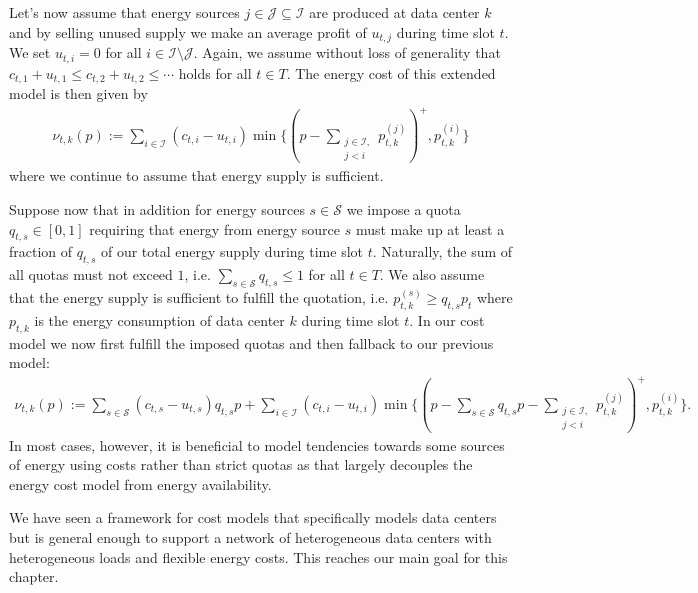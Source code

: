 Let's now assume that energy sources $j \in \mathcal{J} \subseteq \mathcal{I}$ are produced at data center $k$ and by selling unused supply we make an average profit of $u_{t,j}$ during time slot $t$. We set $u_{t,i} = 0$ for all $i \in \mathcal{I} \setminus \mathcal{J}$. Again, we assume without loss of generality that $c_{t,1} + u_{t,1} \leq c_{t,2} + u_{t,2} \leq \cdots$ holds for all $t \in T$. The energy cost of this extended model is then given by \begin{align*}
    \nu_{t,k}(p) := \sum_{i \in \mathcal{I}} (c_{t,i} - u_{t,i}) \min\{(p - \sum_{\substack{j \in \mathcal{I}, \\ j < i}} p_{t,k}^{(j)})^+, p_{t,k}^{(i)}\}
\end{align*} where we continue to assume that energy supply is sufficient.

Suppose now that in addition for energy sources $s \in \mathcal{S}$ we impose a quota $q_{t,s} \in [0,1]$ requiring that energy from energy source $s$ must make up at least a fraction of $q_{t,s}$ of our total energy supply during time slot $t$. Naturally, the sum of all quotas must not exceed $1$, i.e. $\sum_{s \in \mathcal{S}} q_{t,s} \leq 1$ for all $t \in T$. We also assume that the energy supply is sufficient to fulfill the quotation, i.e. $p_{t,k}^{(s)} \geq q_{t,s} p_t$ where $p_{t,k}$ is the energy consumption of data center $k$ during time slot $t$. In our cost model we now first fulfill the imposed quotas and then fallback to our previous model: \begin{align*}
    \nu_{t,k}(p) := \sum_{s \in \mathcal{S}} (c_{t,s} - u_{t,s}) q_{t,s} p + \sum_{i \in \mathcal{I}} (c_{t,i} - u_{t,i}) \min\{(p - \sum_{s \in \mathcal{S}} q_{t,s} p - \sum_{\substack{j \in \mathcal{I}, \\ j < i}} p_{t,k}^{(j)})^+, p_{t,k}^{(i)}\}.
\end{align*} In most cases, however, it is beneficial to model tendencies towards some sources of energy using costs rather than strict quotas as that largely decouples the energy cost model from energy availability.

We have seen a framework for cost models that specifically models data centers but is general enough to support a network of heterogeneous data centers with heterogeneous loads and flexible energy costs. This reaches our main goal for this chapter.
